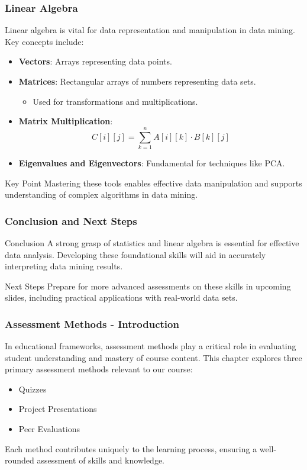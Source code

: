 \documentclass[aspectratio=169]{beamer}
\begin{document}
\begin{frame}[fragile]
    \frametitle{Linear Algebra}
    Linear algebra is vital for data representation and manipulation in data mining. Key concepts include:
    \begin{itemize}
        \item \textbf{Vectors}: Arrays representing data points.
        \item \textbf{Matrices}: Rectangular arrays of numbers representing data sets.
        \begin{itemize}
            \item Used for transformations and multiplications.
        \end{itemize}
        \item \textbf{Matrix Multiplication}:
            \begin{equation}
                C[i][j] = \sum_{k=1}^{n} A[i][k] \cdot B[k][j]
            \end{equation}
        \item \textbf{Eigenvalues and Eigenvectors}: Fundamental for techniques like PCA.
    \end{itemize}
    \begin{block}{Key Point}
        Mastering these tools enables effective data manipulation and supports understanding of complex algorithms in data mining.
    \end{block}
\end{frame}

\begin{frame}[fragile]
    \frametitle{Conclusion and Next Steps}
    \begin{block}{Conclusion}
        A strong grasp of statistics and linear algebra is essential for effective data analysis.
        Developing these foundational skills will aid in accurately interpreting data mining results.
    \end{block}
    \begin{block}{Next Steps}
        Prepare for more advanced assessments on these skills in upcoming slides, including practical applications with real-world data sets.
    \end{block}
\end{frame}

\begin{frame}[fragile]
    \frametitle{Assessment Methods - Introduction}
    In educational frameworks, assessment methods play a critical role in evaluating student understanding and mastery of course content. This chapter explores three primary assessment methods relevant to our course:
    \begin{itemize}
        \item Quizzes
        \item Project Presentations
        \item Peer Evaluations
    \end{itemize}
    Each method contributes uniquely to the learning process, ensuring a well-rounded assessment of skills and knowledge.
\end{frame}
\end{document}
